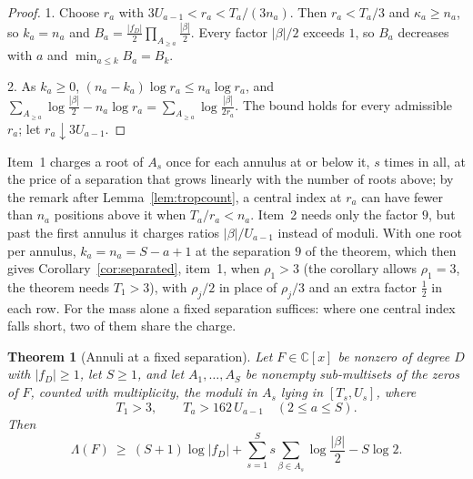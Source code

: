 \documentclass[11pt]{article}
\newtheorem{theorem}{Theorem}[section]
\begin{document}
\begin{proof}
1.  Choose $r_a$ with $3U_{a-1}<r_a<T_a/(3n_a)$.  Then $r_a<T_a/3$ and
$\kappa_a\ge n_a$, so $k_a=n_a$ and
$B_a=\frac{|f_D|}2\prod_{A_{\ge a}}\frac{|\beta|}2$.  Every factor
$|\beta|/2$ exceeds $1$, so $B_a$ decreases with $a$ and
$\min_{a\le k}B_a=B_k$.

2.  As $k_a\ge0$, $(n_a-k_a)\log r_a\le n_a\log r_a$, and
$\sum_{A_{\ge a}}\log\frac{|\beta|}2-n_a\log r_a=\sum_{A_{\ge a}}\log\frac{|\beta|}{2r_a}$.
The bound holds for every admissible $r_a$; let $r_a\downarrow3U_{a-1}$.
\end{proof}

Item~1 charges a root of $A_s$ once for each annulus at or below it, $s$
times in all, at the price of a separation that grows linearly with the
number of roots above; by the remark after Lemma~\ref{lem:tropcount}, a
central index at $r_a$ can have fewer than $n_a$ positions above it when
$T_a/r_a<n_a$.  Item~2 needs only the factor $9$, but past the first
annulus it charges ratios $|\beta|/U_{a-1}$ instead of moduli.  With one root
per annulus, $k_a=n_a=S-a+1$ at the separation $9$ of the theorem, which then
gives Corollary~\ref{cor:separated}, item~1, when $\rho_1>3$ (the corollary
allows $\rho_1=3$, the theorem needs $T_1>3$), with $\rho_j/2$ in place of
$\rho_j/3$ and an extra factor $\frac12$ in each row.  For the mass alone a
fixed separation suffices: where one central index falls short, two of them
share the charge.

\begin{theorem}[Annuli at a fixed separation]\label{thm:fixedgap}
Let $F\in\mathbb C[x]$ be nonzero of degree $D$ with $|f_D|\ge1$, let
$S\ge1$, and let $A_1,\ldots,A_S$ be nonempty sub-multisets of the zeros of
$F$, counted with multiplicity, the moduli in $A_s$ lying in $[T_s,U_s]$,
where
\[
  T_1>3,\qquad T_a>162\,U_{a-1}\quad(2\le a\le S).
\]
Then
\[
  \Lambda(F)\ \ge\ (S+1)\log|f_D|+\sum_{s=1}^Ss\sum_{\beta\in A_s}\log\frac{|\beta|}2-S\log2 .
\]
\end{theorem}
\end{document}
